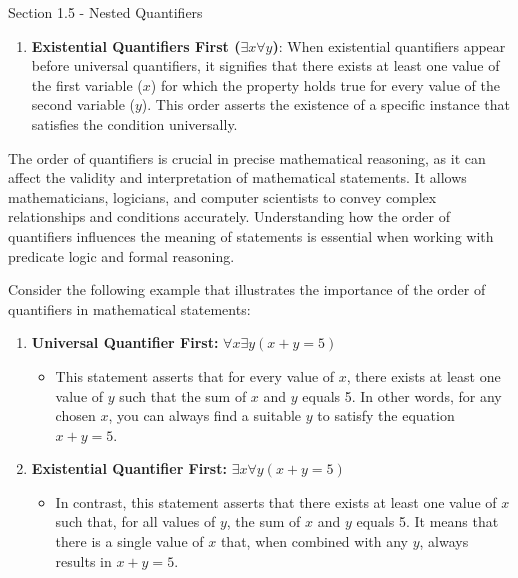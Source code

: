 \begin{notes}{Section 1.5 - Nested Quantifiers}
\begin{enumerate}
        \item \textbf{Existential Quantifiers First (\(\exists x \forall y\))}: When existential quantifiers appear before universal quantifiers, it signifies that there exists at least one value of the first variable (\(x\)) for which the property holds true 
        for every value of the second variable (\(y\)). This order asserts the existence of a specific instance that satisfies the condition universally.
    \end{enumerate}
    
    The order of quantifiers is crucial in precise mathematical reasoning, as it can affect the validity and interpretation of mathematical statements. It allows mathematicians, logicians, and computer scientists to convey complex relationships and conditions 
    accurately. Understanding how the order of quantifiers influences the meaning of statements is essential when working with predicate logic and formal reasoning.
    
    \begin{highlight}
        Consider the following example that illustrates the importance of the order of quantifiers in mathematical statements:
    
        \begin{enumerate}
            \item \textbf{Universal Quantifier First:} \(\forall x \exists y (x + y = 5)\)
            \begin{itemize}
                \item This statement asserts that for every value of \(x\), there exists at least one value of \(y\) such that the sum of \(x\) and \(y\) equals 5. In other words, for any chosen \(x\), you can always find a suitable \(y\) to satisfy the equation 
                \(x + y = 5\).
            \end{itemize}
    
            \item \textbf{Existential Quantifier First:} \(\exists x \forall y (x + y = 5)\)
            \begin{itemize}
                \item In contrast, this statement asserts that there exists at least one value of \(x\) such that, for all values of \(y\), the sum of \(x\) and \(y\) equals 5. It means that there is a single value of \(x\) that, when combined with any \(y\), 
                always results in \(x + y = 5\).
            \end{itemize}
        \end{enumerate}
    

\end{highlight}
\end{notes}
